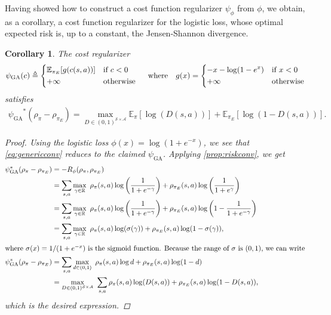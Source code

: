 \documentclass{article}
\newtheorem{corollary}{Corollary}[proposition]
\newcommand\bbR{\ensuremath{\mathbb{R}}} %
\newcommand\bbE{\ensuremath{\mathbb{E}}} %
\newcommand\psiga{\ensuremath{\psi_\text{GA}}}
\newcommand{\1}{\mathbb{I}} %
\begin{document}
Having showed how to construct a cost function regularizer $\psi_\phi$ from $\phi$, we obtain, as a corollary, a cost function regularizer for the logistic loss, whose optimal expected risk is, up to a constant, the Jensen-Shannon divergence.
\begin{corollary}
\label{cor:jsd}
The cost regularizer~
\begin{align*}
\psiga(c) \triangleq \begin{dcases*} \bbE_{\pi_E}[g(c(s,a))] & if $c < 0$ \\ +\infty & otherwise \end{dcases*} \quad\text{where}\quad g(x) = \begin{dcases*}-x-\log(1-e^x) & if $x < 0$ \\ +\infty & otherwise\end{dcases*}
\end{align*}
satisfies
\begin{align}
\psiga^*(\rho_\pi - \rho_{\pi_E}) = \max_{D \in (0,1)^{\mathcal{S} \times \mathcal{A}}} \bbE_{\pi}[\log(D(s,a))] + \bbE_{\pi_E}[\log(1-D(s,a))].
\end{align}
\begin{proof}
Using the logistic loss $\phi(x) = \log(1+e^{-x})$, we see that \cref{eq:genericconv} reduces to the claimed $\psiga$.
Applying \cref{prop:riskconv}, we get
\begin{align}
\psiga^*(\rho_\pi - \rho_{\pi_E}) &= -R_\phi(\rho_\pi, \rho_{\pi_E}) \\
&= \sum_{s,a} \max_{\gamma\in\bbR}\ \rho_\pi(s,a)\log\left(\frac{1}{1+e^{-\gamma}}\right) + \rho_{\pi_E}(s,a)\log\left(\frac{1}{1+e^{\gamma}}\right) \\
&= \sum_{s,a} \max_{\gamma\in\bbR}\ \rho_\pi(s,a)\log\left(\frac{1}{1+e^{-\gamma}}\right) + \rho_{\pi_E}(s,a)\log\left(1 - \frac{1}{1+e^{-\gamma}}\right) \\
&= \sum_{s,a} \max_{\gamma\in\bbR}\ \rho_\pi(s,a)\log(\sigma(\gamma)) + \rho_{\pi_E}(s,a)\log(1 - \sigma(\gamma)), \\
\intertext{where $\sigma(x) = 1/(1+e^{-x})$ is the sigmoid function. Because the range of $\sigma$ is $(0,1)$, we can write}
\psiga^*(\rho_\pi - \rho_{\pi_E}) &= \sum_{s,a} \max_{d \in (0,1)}\ \rho_\pi(s,a)\log d + \rho_{\pi_E}(s,a)\log(1 - d) \\
&= \max_{D \in (0,1)^{\mathcal{S} \times \mathcal{A}}}\ \sum_{s,a} \rho_\pi(s,a)\log(D(s,a)) + \rho_{\pi_E}(s,a)\log(1 - D(s,a)),
\end{align}
which is the desired expression.
\end{proof}
\end{corollary}
\end{document}
